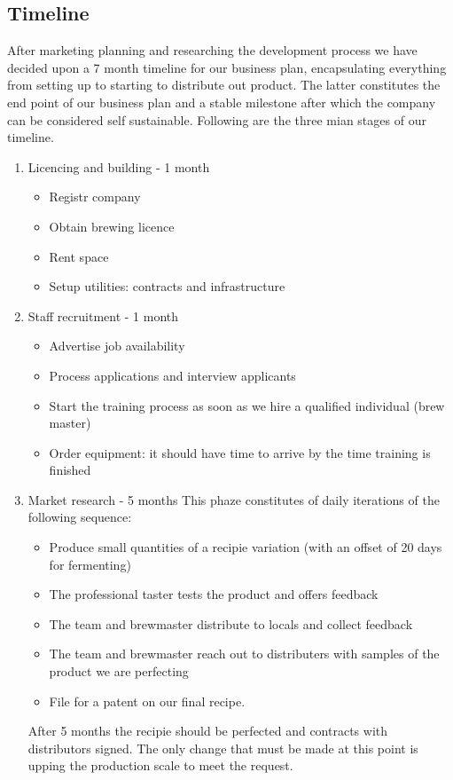 \documentclass[11pt]{article}
\begin{document}
  \subsection{Timeline}
After marketing planning and researching the development process we have decided upon a 7 month timeline for our business plan, encapsulating everything from setting up to starting to distribute out product. The latter constitutes the end point of our business plan and a stable milestone after which the company can be considered self sustainable. Following are the three mian stages of our timeline.

  \begin{enumerate}
  \item Licencing and building - 1 month \\
    \begin{itemize}
    \item Registr company
    \item Obtain brewing licence
    \item Rent space
    \item Setup utilities: contracts and infrastructure
  \end{itemize}

  \item Staff recruitment - 1 month
    \begin{itemize}
    \item Advertise job availability
    \item Process applications and interview applicants
    \item Start the training process as soon as we hire a qualified individual (brew master)
    \item Order equipment: it should have time to arrive by the time training is finished
    \end{itemize}

  \item Market research - 5 months
This phaze constitutes of daily iterations of the following sequence:
\begin{itemize}
\item Produce small quantities of a recipie variation (with an offset of 20 days for fermenting)
\item The professional taster tests the product and offers feedback
\item The team and brewmaster distribute to locals and collect feedback
\item The team and brewmaster reach out to distributers with samples of the product we are perfecting
\item File for a patent on our final recipe. 
\end{itemize}
\noindent After 5 months the recipie should be perfected and contracts with distributors signed. The only change that must be made at this point is upping the production scale to meet the request.
  \end{enumerate}
\newpage
\end{document}
